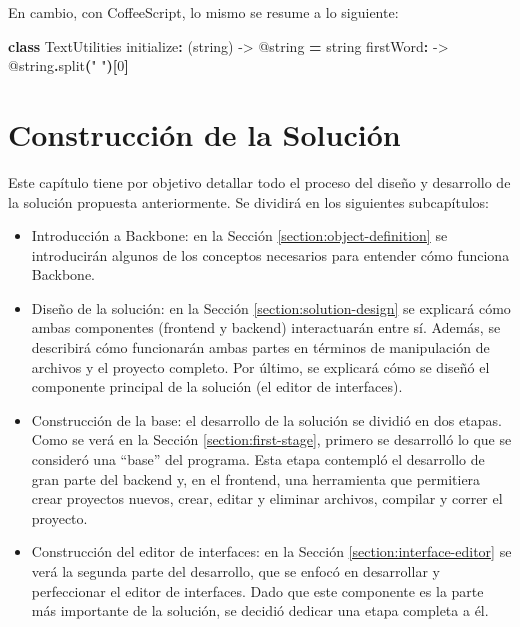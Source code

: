 \documentclass[12pt,spanish,letter]{report}
\newenvironment{Shaded}{}{}
\newcommand{\KeywordTok}[1]{\textcolor[rgb]{0.00,0.44,0.13}{\textbf{{#1}}}}
\newcommand{\DataTypeTok}[1]{\textcolor[rgb]{0.56,0.13,0.00}{{#1}}}
\newcommand{\DecValTok}[1]{\textcolor[rgb]{0.25,0.63,0.44}{{#1}}}
\newcommand{\StringTok}[1]{\textcolor[rgb]{0.25,0.44,0.63}{{#1}}}
\newcommand{\FunctionTok}[1]{\textcolor[rgb]{0.02,0.16,0.49}{{#1}}}
\newcommand{\NormalTok}[1]{{#1}}
\begin{document}
En cambio, con CoffeeScript, lo mismo se resume a lo siguiente:

\begin{Shaded}
\begin{Highlighting}[]
\KeywordTok{class} \DataTypeTok{TextUtilities}
  \NormalTok{initialize}\KeywordTok{:} \FunctionTok{(string) ->} \DataTypeTok{@string} \KeywordTok{=} \NormalTok{string}
  \NormalTok{firstWord}\KeywordTok{:} \FunctionTok{->} \DataTypeTok{@string}\KeywordTok{.}\NormalTok{split}\KeywordTok{(}\StringTok{" "}\KeywordTok{)[}\DecValTok{0}\KeywordTok{]}
\end{Highlighting}
\end{Shaded}

\clearpage
\newpage

\chapter{Construcción de la Solución}

\label{section:construction}

Este capítulo tiene por objetivo detallar todo el proceso del diseño y
desarrollo de la solución propuesta anteriormente. Se dividirá en los
siguientes subcapítulos:

\begin{itemize}
\item
  Introducción a Backbone: en la Sección \ref{section:object-definition}
  se introducirán algunos de los conceptos necesarios para entender cómo
  funciona Backbone.
\item
  Diseño de la solución: en la Sección \ref{section:solution-design} se
  explicará cómo ambas componentes (frontend y backend) interactuarán
  entre sí. Además, se describirá cómo funcionarán ambas partes en
  términos de manipulación de archivos y el proyecto completo. Por
  último, se explicará cómo se diseñó el componente principal de la
  solución (el editor de interfaces).
\item
  Construcción de la base: el desarrollo de la solución se dividió en
  dos etapas. Como se verá en la Sección \ref{section:first-stage},
  primero se desarrolló lo que se consideró una ``base'' del programa.
  Esta etapa contempló el desarrollo de gran parte del backend y, en el
  frontend, una herramienta que permitiera crear proyectos nuevos,
  crear, editar y eliminar archivos, compilar y correr el proyecto.
\item
  Construcción del editor de interfaces: en la Sección
  \ref{section:interface-editor} se verá la segunda parte del
  desarrollo, que se enfocó en desarrollar y perfeccionar el editor de
  interfaces. Dado que este componente es la parte más importante de la
  solución, se decidió dedicar una etapa completa a él.
\end{itemize}
\end{document}
